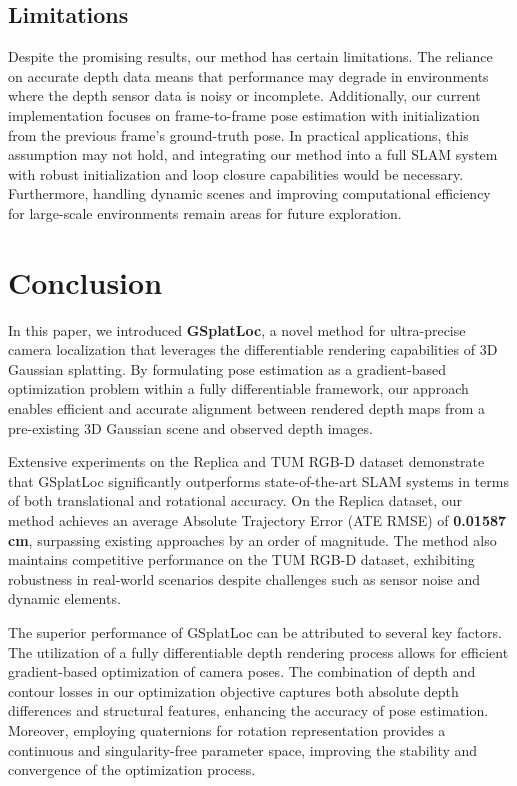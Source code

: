 \documentclass[twocolumn]{article}
\begin{document}
\subsection{Limitations}\label{limitations}

Despite the promising results, our method has certain limitations. The
reliance on accurate depth data means that performance may degrade in
environments where the depth sensor data is noisy or incomplete.
Additionally, our current implementation focuses on frame-to-frame pose
estimation with initialization from the previous frame's ground-truth
pose. In practical applications, this assumption may not hold, and
integrating our method into a full SLAM system with robust
initialization and loop closure capabilities would be necessary.
Furthermore, handling dynamic scenes and improving computational
efficiency for large-scale environments remain areas for future
exploration.

\section{Conclusion}\label{conclusion}

In this paper, we introduced \textbf{GSplatLoc}, a novel method for
ultra-precise camera localization that leverages the differentiable
rendering capabilities of 3D Gaussian splatting. By formulating pose
estimation as a gradient-based optimization problem within a fully
differentiable framework, our approach enables efficient and accurate
alignment between rendered depth maps from a pre-existing 3D Gaussian
scene and observed depth images.

Extensive experiments on the Replica and TUM RGB-D
dataset\autocite{sturmBenchmarkEvaluationRGBD2012} demonstrate that
GSplatLoc significantly outperforms state-of-the-art SLAM systems in
terms of both translational and rotational accuracy. On the Replica
dataset, our method achieves an average Absolute Trajectory Error (ATE
RMSE) of \textbf{0.01587 cm}, surpassing existing approaches by an order
of magnitude. The method also maintains competitive performance on the
TUM RGB-D dataset\autocite{sturmBenchmarkEvaluationRGBD2012}, exhibiting
robustness in real-world scenarios despite challenges such as sensor
noise and dynamic elements.

The superior performance of GSplatLoc can be attributed to several key
factors. The utilization of a fully differentiable depth rendering
process allows for efficient gradient-based optimization of camera
poses. The combination of depth and contour losses in our optimization
objective captures both absolute depth differences and structural
features, enhancing the accuracy of pose estimation. Moreover, employing
quaternions for rotation representation provides a continuous and
singularity-free parameter space, improving the stability and
convergence of the optimization process.
\end{document}
